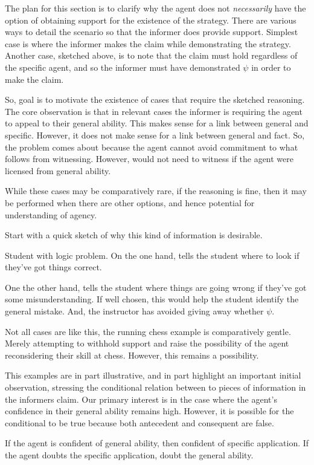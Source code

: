 \documentclass[10pt]{article}
\begin{document}
The plan for this section is to clarify why the agent does not \emph{necessarily} have the option of obtaining support for the existence of the strategy.
There are various ways to detail the scenario so that the informer does provide support.
Simplest case is where the informer makes the claim while demonstrating the strategy.
Another case, sketched above, is to note that the claim must hold regardless of the specific agent, and so the informer must have demonstrated \(\psi\) in order to make the claim.

So, goal is to motivate the existence of cases that require the sketched reasoning.
The core observation is that in relevant cases the informer is requiring the agent to appeal to their general ability.
This makes sense for a link between general and specific.
However, it does not make sense for a link between general and fact.
So, the problem comes about because the agent cannot avoid commitment to what follows from witnessing.
However, would not need to witness if the agent were licensed from general ability.

While these cases may be comparatively rare, if the reasoning is fine, then it may be performed when there are other options, and hence potential for understanding of agency.

Start with a quick sketch of why this kind of information is desirable.

Student with logic problem.
On the one hand, tells the student where to look if they've got things correct.

One the other hand, tells the student where things are going wrong if they've got some misunderstanding.
If well chosen, this would help the student identify the general mistake.
And, the instructor has avoided giving away whether \(\psi\).

Not all cases are like this, the running chess example is comparatively gentle.
Merely attempting to withhold support and raise the possibility of the agent reconsidering their skill at chess.
However, this remains a possibility.

This examples are in part illustrative, and in part highlight an important initial observation, stressing the conditional relation between to pieces of information in the informers claim.
Our primary interest is in the case where the agent's confidence in their general ability remains high.
However, it is possible for the conditional to be true because both antecedent and consequent are false.

If the agent is confident of general ability, then confident of specific application.
If the agent doubts the specific application, doubt the general ability.
\end{document}

